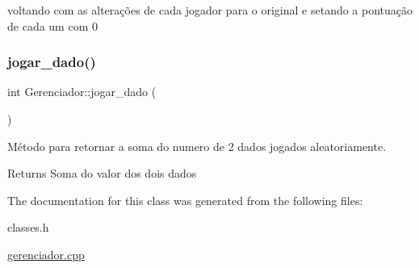 voltando com as alterações de cada jogador para o original e setando a pontuação de cada um com 0\mbox{\label{classGerenciador_afb1df83365cd8c225af375087aaff983}} 
\subsubsection{\texorpdfstring{jogar\+\_\+dado()}{jogar\_dado()}}
{\footnotesize\ttfamily int Gerenciador\+::jogar\+\_\+dado (\begin{DoxyParamCaption}{ }\end{DoxyParamCaption})}



Método para retornar a soma do numero de 2 dados jogados aleatoriamente. 

\begin{DoxyReturn}{Returns}
Soma do valor dos dois dados 
\end{DoxyReturn}


The documentation for this class was generated from the following files\+:\begin{DoxyCompactItemize}
\item 
classes.\+h\item 
\hyperlink{gerenciador_8cpp}{gerenciador.\+cpp}\end{DoxyCompactItemize}
